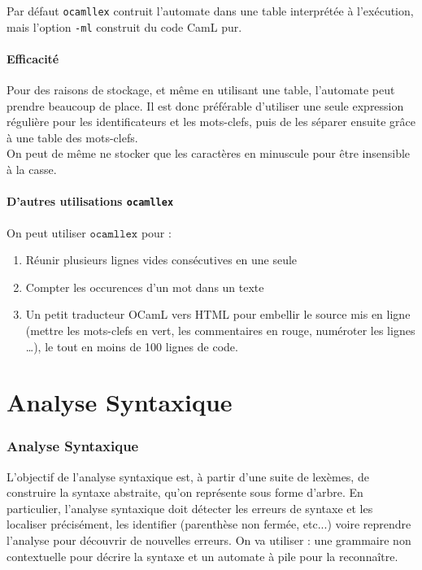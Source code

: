 \documentclass{cours}
\begin{document}
Par défaut \texttt{ocamllex} contruit l'automate dans une table interprétée à l'exécution, mais l'option \texttt{-ml} construit du code CamL pur.

\subsection{Efficacité}
Pour des raisons de stockage, et même en utilisant une table, l'automate peut prendre beaucoup de place. Il est donc préférable d'utiliser une seule expression régulière pour les identificateurs et les mots-clefs, puis de les séparer ensuite grâce à une table des mots-clefs.\\
On peut de même ne stocker que les caractères en minuscule pour être insensible à la casse.

\subsection{D'autres utilisations \texttt{ocamllex}}
On peut utiliser $\texttt{ocamllex}$ pour :
\begin{enumerate}
    \item Réunir plusieurs lignes vides consécutives en une seule
    \item Compter les occurences d'un mot dans un texte
    \item Un petit traducteur OCamL vers HTML pour embellir le source mis en ligne (mettre les mots-clefs en vert, les commentaires en rouge, numéroter les lignes \dots), le tout en moins de 100 lignes de code.
\end{enumerate}

\newpage
\part{Analyse Syntaxique}\label{part:AnalyseSyntaxique}
\localtableofcontents
\section{Analyse Syntaxique}
L'objectif de l'analyse syntaxique est, à partir d'une suite de lexèmes, de construire la syntaxe abstraite, qu'on représente sous forme d'arbre. En particulier, l'analyse syntaxique doit détecter les erreurs de syntaxe et les localiser précisément, les identifier (parenthèse non fermée, etc...) voire reprendre l'analyse pour découvrir de nouvelles erreurs. On va utiliser : une grammaire non contextuelle pour décrire la syntaxe et un automate à pile pour la reconnaître.
\end{document}
